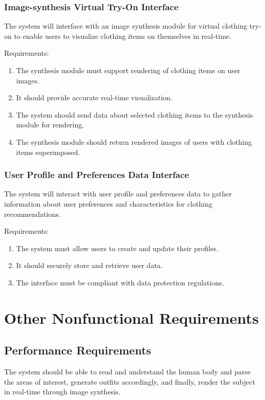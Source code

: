 		\subsubsection{Image-synthesis Virtual Try-On Interface}
            The system will interface with an image synthesis module for virtual clothing try-on to enable users to visualize clothing items on themselves in real-time.

			Requirements:
			\begin{enumerate}
				\item The synthesis module must support rendering of clothing items on user images.
				\item It should provide accurate real-time visualization.
				\item The system should send data about selected clothing items to the synthesis module for rendering.
				\item The synthesis module should return rendered images of users with clothing items superimposed.
			\end{enumerate}

		\subsubsection{User Profile and Preferences Data Interface}
			The system will interact with user profile and preferences data to gather information about user preferences and characteristics for clothing recommendations.

			Requirements:
			\begin{enumerate}
				\item The system must allow users to create and update their profiles.
				\item It should securely store and retrieve user data.
				\item The interface must be compliant with data protection regulations.
			\end{enumerate}

\section{Other Nonfunctional Requirements}
	\subsection{Performance Requirements}
        The system should be able to read and understand the human body and parse the areas of interest, generate outfits accordingly, and finally, render the subject in real-time through image synthesis.
		
